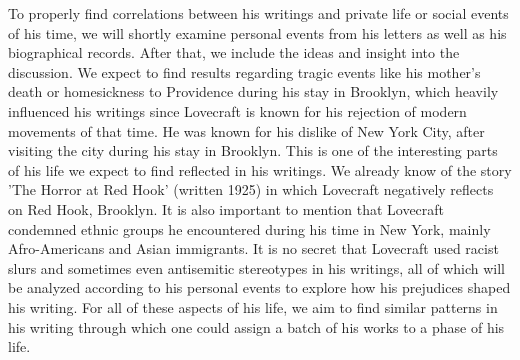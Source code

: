 To properly find correlations between his writings and private life or social events of his time, 
we will shortly examine personal events from his letters as well as his biographical records. After 
that, we include the ideas and insight into the discussion. We expect to find results regarding 
tragic events like his mother's death or homesickness to Providence during his stay in Brooklyn, 
which heavily influenced his writings since Lovecraft is known for his rejection of modern 
movements of that time. He was known for his dislike of New York City, after visiting the city 
during his stay in Brooklyn. This is one of the interesting parts of his life we expect to find 
reflected in his writings. We already know of the story 'The Horror at Red Hook' (written 1925) 
in which Lovecraft negatively reflects on Red Hook, Brooklyn. It is also important to mention 
that Lovecraft condemned ethnic groups he encountered during his time in New York, mainly 
Afro-Americans and Asian immigrants. It is no secret that Lovecraft used racist slurs and sometimes 
even antisemitic stereotypes in his writings, all of which will be analyzed according to his 
personal events to explore how his prejudices shaped his writing. For all of these aspects of his 
life, we aim to find similar patterns in his writing through which one could assign a batch of 
his works to a phase of his life.